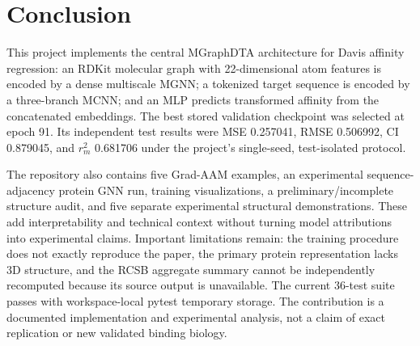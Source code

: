 \chapter{Conclusion}
This project implements the central MGraphDTA architecture for Davis affinity regression: an RDKit molecular graph with 22-dimensional atom features is encoded by a dense multiscale MGNN; a tokenized target sequence is encoded by a three-branch MCNN; and an MLP predicts transformed affinity from the concatenated embeddings. The best stored validation checkpoint was selected at epoch 91. Its independent test results were MSE 0.257041, RMSE 0.506992, CI 0.879045, and $r_m^2$ 0.681706 under the project's single-seed, test-isolated protocol.

The repository also contains five Grad-AAM examples, an experimental sequence-adjacency protein GNN run, training visualizations, a preliminary/incomplete structure audit, and five separate experimental structural demonstrations. These add interpretability and technical context without turning model attributions into experimental claims. Important limitations remain: the training procedure does not exactly reproduce the paper, the primary protein representation lacks 3D structure, and the RCSB aggregate summary cannot be independently recomputed because its source output is unavailable. The current 36-test suite passes with workspace-local pytest temporary storage. The contribution is a documented implementation and experimental analysis, not a claim of exact replication or new validated binding biology.
